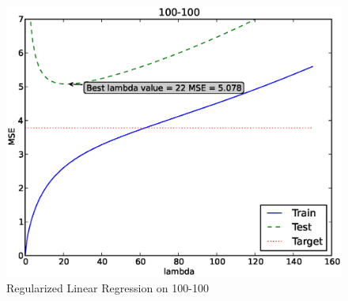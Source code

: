\documentclass[12pt]{article}
\begin{document}
\begin{figure}[h]
\includegraphics[height=.5\textheight]{1/100-100.eps}
\caption{Regularized Linear Regression on 100-100}
\label{fig:1-100-100}
\end{figure}
\end{document}
